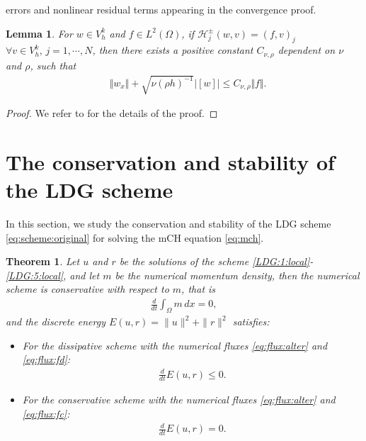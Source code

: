 \documentclass[11pt]{article}
\newcommand{\Cnurho}{C_{\nu,\rho}}
\newcommand{\norm}   [1] {\Vert#1\Vert}
\newcommand{\normb}  [1] {|\![#1]\!|}
\newcommand{\Hcal} {\mathcal{H}}
\newtheorem{lemma}{Lemma}[section]
\newtheorem{theorem}{Theorem}[section]
\numberwithin{equation}{section}
\begin{document}
errors and nonlinear residual terms appearing in the convergence proof.
\begin{lemma}\label{lemma:ux:qx}
For $w\in V_h^k$ and $f\in L^2(\Omega)$, if $\Hcal_j^\pm(w,v)=(f,v)_j$ $\forall v\in V_h^k, \, j=1, \cdots, N$, then there exists a positive constant $\Cnurho$ dependent on $\nu$ and $\rho$, such that
\begin{align}
& \norm{w_x}+ \sqrt{\nu (\rho h)^{-1}}\normb{w} \le \Cnurho \norm{f}. \label{w_x}
\end{align}
\end{lemma}
\begin{proof}
We refer to \cite{Wang2015} for the details of the proof.
\end{proof}			
\section{The conservation and stability of the LDG scheme}\label{sec3}\setcounter{equation}{0}
In this section, we study the conservation and stability of the LDG scheme \eqref{eq:scheme:original} for solving the mCH equation \eqref{eq:mch}.
\begin{theorem}\label{thm:stab}
Let $u$ and $r$ be the solutions of the scheme \eqref{LDG:1:local}-\eqref{LDG:5:local}, and let $m$ be the numerical momentum density, 
then the numerical scheme is conservative with respect to $m$, that is
\begin{align}\label{eq:conservation}
    \frac{d}{dt}\int_{\Omega}m \,dx =0,
\end{align}
and the discrete energy $E(u, r)=\|u\|^2+\|r\|^2$ satisfies:
\begin{itemize}
  \item For the dissipative scheme with the numerical fluxes \eqref{eq:flux:alter} and \eqref{eq:flux:fd}{\rm :}
  \begin{align}
  \frac{d}{dt}E(u, r)\leq 0. \label{stability:ineq1}
  \end{align}
  \item
  For the conservative scheme with the numerical fluxes \eqref{eq:flux:alter} and \eqref{eq:flux:fc}{\rm :}
  \begin{align}
  \frac{d}{dt}E(u, r)=0. \label{stability:ineq2}
  \end{align}
\end{itemize}
\end{theorem}				
\end{document}
